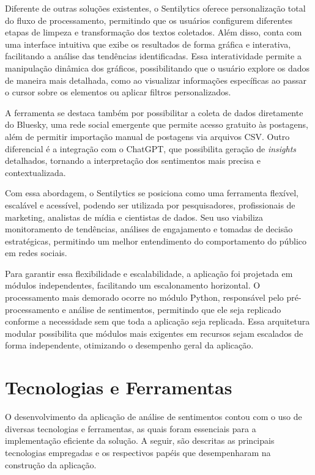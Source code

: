 \documentclass[
	12pt,				%
	oneside,			%
	a4paper,			%
	english,			%
	french,				%
	spanish,			%
	brazil				%
	]{abntex2}
\begin{document}
Diferente de outras soluções existentes, o Sentilytics oferece
personalização total do fluxo de processamento, permitindo que os
usuários configurem diferentes etapas de limpeza e transformação dos
textos coletados. Além disso, conta com uma interface intuitiva que
exibe os resultados de forma gráfica e interativa, facilitando a análise
das tendências identificadas. Essa interatividade permite a manipulação
dinâmica dos gráficos, possibilitando que o usuário explore os dados de
maneira mais detalhada, como ao visualizar informações específicas ao
passar o cursor sobre os elementos ou aplicar filtros personalizados.

A ferramenta se destaca também por possibilitar a coleta de dados
diretamente do Bluesky, uma rede social emergente que permite acesso
gratuito às postagens, além de permitir importação manual de postagens
via arquivos CSV. Outro diferencial é a integração com o ChatGPT, que
possibilita geração de \emph{insights} detalhados, tornando a
interpretação dos sentimentos mais precisa e contextualizada.

Com essa abordagem, o Sentilytics se posiciona como uma ferramenta
flexível, escalável e acessível, podendo ser utilizada por
pesquisadores, profissionais de marketing, analistas de mídia e
cientistas de dados. Seu uso viabiliza monitoramento de tendências,
análises de engajamento e tomadas de decisão estratégicas, permitindo um
melhor entendimento do comportamento do público em redes sociais.

Para garantir essa flexibilidade e escalabilidade, a aplicação foi
projetada em módulos independentes, facilitando um escalonamento
horizontal. O processamento mais demorado ocorre no módulo Python,
responsável pelo pré-processamento e análise de sentimentos, permitindo
que ele seja replicado conforme a necessidade sem que toda a aplicação
seja replicada. Essa arquitetura modular possibilita que módulos mais
exigentes em recursos sejam escalados de forma independente, otimizando
o desempenho geral da aplicação.

\hypertarget{tecnologias-e-ferramentas}{%
\section{Tecnologias e Ferramentas}\label{tecnologias-e-ferramentas}}

O desenvolvimento da aplicação de análise de sentimentos contou com o
uso de diversas tecnologias e ferramentas, as quais foram essenciais
para a implementação eficiente da solução. A seguir, são descritas as
principais tecnologias empregadas e os respectivos papéis que
desempenharam na construção da aplicação.
\end{document}
